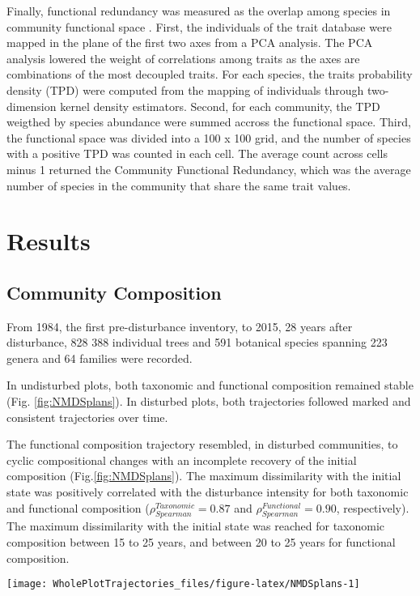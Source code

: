 \documentclass[fleqn,10pt]{ArtEcoFoG} %
\theoremstyle{definition}
\theoremstyle{definition}
\theoremstyle{definition}
\theoremstyle{remark}
\begin{document}
Finally, functional redundancy was measured as the overlap among species
in community functional space \citep{Carmona2016}. First, the
individuals of the trait database were mapped in the plane of the first
two axes from a PCA analysis. The PCA analysis lowered the weight of
correlations among traits as the axes are combinations of the most
decoupled traits. For each species, the traits probability density (TPD)
were computed from the mapping of individuals through two-dimension
kernel density estimators. Second, for each community, the TPD weigthed
by species abundance were summed accross the functional space. Third,
the functional space was divided into a 100 x 100 grid, and the number
of species with a positive TPD was counted in each cell. The average
count across cells minus 1 returned the Community Functional Redundancy,
which was the average number of species in the community that share the
same trait values.

\section{Results}\label{results}

\subsection{Community Composition}\label{community-composition}

From 1984, the first pre-disturbance inventory, to 2015, 28 years after
disturbance, 828 388 individual trees and 591 botanical species spanning
223 genera and 64 families were recorded.

In undisturbed plots, both taxonomic and functional composition remained
stable (Fig. \ref{fig:NMDSplans}). In disturbed plots, both trajectories
followed marked and consistent trajectories over time.

The functional composition trajectory resembled, in disturbed
communities, to cyclic compositional changes with an incomplete recovery
of the initial composition (Fig.\ref{fig:NMDSplans}). The maximum
dissimilarity with the initial state was positively correlated with the
disturbance intensity for both taxonomic and functional composition
(\(\rho_{Spearman}^{Taxonomic}=0.87\) and
\(\rho_{Spearman}^{Functional}=0.90\), respectively). The maximum
dissimilarity with the initial state was reached for taxonomic
composition between 15 to 25 years, and between 20 to 25 years for
functional composition.

\begin{figure*}

{\centering \texttt{[image: WholePlotTrajectories\_files/figure-latex/NMDSplans-1]} 

}

\caption{Plot trajectories in terms of taxonomic composition (\textbf{(a)} and \textbf{(c)}), and functional composition (\textbf{(b)} and \textbf{(d)}) in a two-dimensional NMDS plane. Lower panels (\textbf{(c)} and \textbf{(d)}) represent the Euclidean distance to initial condition along the 30 sampled years. Shaded areas are the credibility intervals.}\label{fig:NMDSplans}
\end{figure*}
\end{document}
